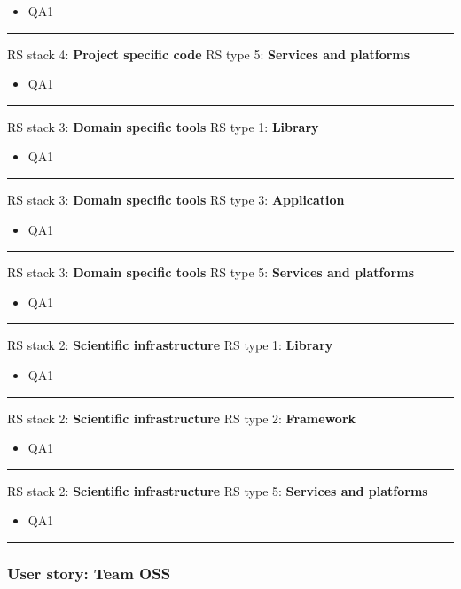 \begin{itemize}
    \item QA1
\end{itemize}
\hrule

RS stack 4: \textbf{Project specific code} \tab RS type 5: \textbf{Services and platforms}

\begin{itemize}
    \item QA1
\end{itemize}
\hrule

RS stack 3: \textbf{Domain specific tools} \tab RS type 1: \textbf{Library}

\begin{itemize}
    \item QA1
\end{itemize}
\hrule

RS stack 3: \textbf{Domain specific tools} \tab RS type 3: \textbf{Application}

\begin{itemize}
    \item QA1
\end{itemize}
\hrule

RS stack 3: \textbf{Domain specific tools} \tab RS type 5: \textbf{Services and platforms}

\begin{itemize}
    \item QA1
\end{itemize}
\hrule

RS stack 2: \textbf{Scientific infrastructure} \tab RS type 1: \textbf{Library}

\begin{itemize}
    \item QA1
\end{itemize}
\hrule

RS stack 2: \textbf{Scientific infrastructure} \tab RS type 2: \textbf{Framework}

\begin{itemize}
    \item QA1
\end{itemize}
\hrule

RS stack 2: \textbf{Scientific infrastructure} \tab RS type 5: \textbf{Services and platforms}

\begin{itemize}
    \item QA1
\end{itemize}
\hrule

\subsubsection{User story: Team OSS}

